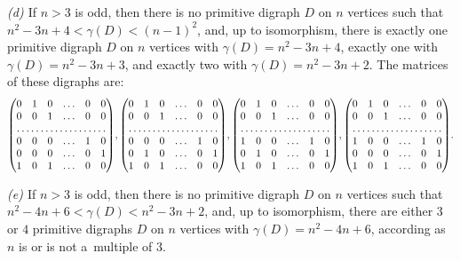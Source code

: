 \documentclass[11pt]{llncs}
\begin{document}
\begin{theorem}
\emph{(d) \cite[Theorem~8]{DM64}} If $n>3$ is odd, then there is no
primitive digraph $D$ on $n$ vertices such that $n^2-3n+4<\gamma(D)<(n-1)^2$,
and, up to isomorphism, there is exactly one primitive digraph $D$ on $n$ vertices
with $\gamma(D)=n^2-3n+4$, exactly one with $\gamma(D)=n^2-3n+3$, and
exactly two with $\gamma(D)=n^2-3n+2$. The matrices of these digraphs are:
\begin{equation}
\label{odd island}
\begin{pmatrix}
0 & 1 & 0 & \dots & 0 & 0\\
0 & 0 & 1 & \dots & 0 & 0\\
\hdotsfor{6}\\
0 & 0 & 0 & \dots & 1 & 0\\
0 & 0 & 0 & \dots & 0 & 1\\
1 & 0 & 1 & \dots & 0 & 0
\end{pmatrix}\!,
\begin{pmatrix}
0 & 1 & 0 & \dots & 0 & 0\\
0 & 0 & 1 & \dots & 0 & 0\\
\hdotsfor{6}\\
0 & 0 & 0 & \dots & 1 & 0\\
0 & 1 & 0 & \dots & 0 & 1\\
1 & 0 & 1 & \dots & 0 & 0
\end{pmatrix}\!,
\begin{pmatrix}
0 & 1 & 0 & \dots & 0 & 0\\
0 & 0 & 1 & \dots & 0 & 0\\
\hdotsfor{6}\\
1 & 0 & 0 & \dots & 1 & 0\\
0 & 1 & 0 & \dots & 0 & 1\\
1 & 0 & 1 & \dots & 0 & 0
\end{pmatrix}\!,
\begin{pmatrix}
0 & 1 & 0 & \dots & 0 & 0\\
0 & 0 & 1 & \dots & 0 & 0\\
\hdotsfor{6}\\
1 & 0 & 0 & \dots & 1 & 0\\
0 & 0 & 0 & \dots & 0 & 1\\
1 & 0 & 1 & \dots & 0 & 0
\end{pmatrix}\!.
\end{equation}

\emph{(e) \cite[Theorem~8]{DM64}} If $n>3$ is odd, then there is no
primitive digraph $D$ on $n$ vertices such that $n^2-4n+6<\gamma(D)<n^2-3n+2$,
and, up to isomorphism, there are either $3$ or $4$ primitive digraphs $D$
on $n$ vertices with $\gamma(D)=n^2-4n+6$, according as $n$ is or is not
a~multiple of $3$.
\end{theorem}
\end{document}
